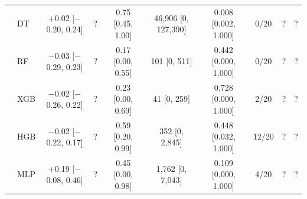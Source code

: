 \begin{tabular}{llcccccccc}
 & DT & +0.02 [$-$0.20, 0.24] & ? & 0.75 [0.45, 1.00] & 46{,}906 [0, 127{,}390] & 0.008 [0.002, 1.000] & 0/20 & ? & ? \\
 & RF & $-$0.03 [$-$0.29, 0.23] & ? & 0.17 [0.00, 0.55] & 101 [0, 511] & 0.442 [0.000, 1.000] & 0/20 & ? & ? \\
 & XGB & $-$0.02 [$-$0.26, 0.22] & ? & 0.23 [0.00, 0.69] & 41 [0, 259] & 0.728 [0.000, 1.000] & 2/20 & ? & ? \\
 & HGB & $-$0.02 [$-$0.22, 0.17] & ? & 0.59 [0.20, 0.99] & 352 [0, 2{,}845] & 0.448 [0.032, 1.000] & 12/20 & ? & ? \\
 & MLP & +0.19 [$-$0.08, 0.46] & ? & 0.45 [0.00, 0.98] & 1{,}762 [0, 7{,}043] & 0.109 [0.000, 1.000] & 4/20 & ? & ? \\
\bottomrule
\end{tabular}
